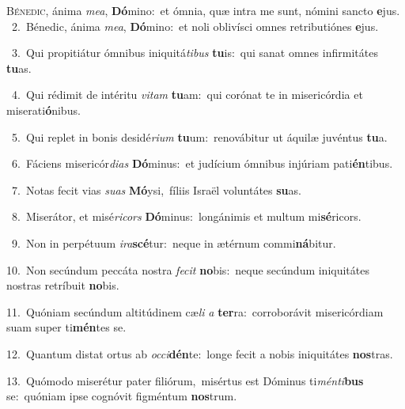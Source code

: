 \lettrine{\initial\textcolor{\initialcolor}{B}}{énedic,} ánima \textit{me}\-\textit{a}, \textbf{Dó}\-mino:~\star et ómnia, quæ intra me sunt, nómini sancto \textbf{e}\-jus.\\
{\numbfont\textcolor{\numbcolor}{~2.}}~Bénedic, ánima \textit{me}\-\textit{a}, \textbf{Dó}\-mino:~\star et noli oblivísci omnes retributiónes \textbf{e}\-jus.\par
{\numbfont\textcolor{\numbcolor}{~3.}}~Qui propitiátur ómnibus iniquitá\-\textit{ti}\-\textit{bus} \textbf{tu}\-is:~\star qui sanat omnes infirmitátes \textbf{tu}\-as.\par
{\numbfont\textcolor{\numbcolor}{~4.}}~Qui rédimit de intéritu \textit{vi}\-\textit{tam} \textbf{tu}\-am:~\star qui corónat te in misericórdia et miserati\-\textbf{ó}\-nibus.\par
{\numbfont\textcolor{\numbcolor}{~5.}}~Qui replet in bonis desidé\-\textit{ri}\-\textit{um} \textbf{tu}\-um:~\star renovábitur ut áquilæ juvéntus \textbf{tu}\-a.\par
{\numbfont\textcolor{\numbcolor}{~6.}}~Fáciens misericór\-\textit{di}\-\textit{as} \textbf{Dó}\-minus:~\star et judícium ómnibus injúriam pati\-\textbf{én}\-tibus.\par
{\numbfont\textcolor{\numbcolor}{~7.}}~Notas fecit vias \textit{su}\-\textit{as} \textbf{Mó}\-ysi,~\star fíliis Israël voluntátes \textbf{su}\-as.\par
{\numbfont\textcolor{\numbcolor}{~8.}}~Miserátor, et misé\-\textit{ri}\-\textit{cors} \textbf{Dó}\-minus:~\star longánimis et multum mi\-\textbf{sé}\-ricors.\par
{\numbfont\textcolor{\numbcolor}{~9.}}~Non in perpétuum \textit{i}\-\textit{ra}\textbf{scé}tur:~\star neque in ætérnum commi\-\textbf{ná}\-bitur.\par
{\numbfont\textcolor{\numbcolor}{10.}}~Non secúndum peccáta nostra \textit{fe}\-\textit{cit} \textbf{no}\-bis:~\star neque secúndum iniquitátes nostras retríbuit \textbf{no}\-bis.\par
{\numbfont\textcolor{\numbcolor}{11.}}~Quóniam secúndum altitúdinem cæ\textit{li} \textit{a} \textbf{ter}\-ra:~\star corroborávit misericórdiam suam super ti\-\textbf{mén}\-tes se.\par
{\numbfont\textcolor{\numbcolor}{12.}}~Quantum distat ortus ab \textit{oc}\-\textit{ci}\textbf{dén}te:~\star longe fecit a nobis iniquitátes \textbf{nos}\-tras.\par
{\numbfont\textcolor{\numbcolor}{13.}}~Quómodo miserétur pater filiórum,~\dagger misértus est Dóminus ti\-\textit{mén}\-\textit{ti}\textbf{bus} se:~\star quóniam ipse cognóvit figméntum \textbf{nos}\-trum.\par
